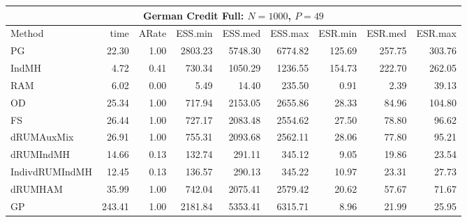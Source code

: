 \begin{table}
\begin{tabular}{l r r r r r r r r } 
\hline
\multicolumn{9}{c}{German Credit Full: $N = 1000$, $P=49$} \\
\hline
          Method  &     time &    ARate &  ESS.min &  ESS.med &  ESS.max &  ESR.min &  ESR.med &  ESR.max \\ 
              PG  &    22.30 &     1.00 &  2803.23 &  5748.30 &  6774.82 &   125.69 &   257.75 &   303.76 \\ 
           IndMH  &     4.72 &     0.41 &   730.34 &  1050.29 &  1236.55 &   154.73 &   222.70 &   262.05 \\ 
             RAM  &     6.02 &     0.00 &     5.49 &    14.40 &   235.50 &     0.91 &     2.39 &    39.13 \\ 
              OD  &    25.34 &     1.00 &   717.94 &  2153.05 &  2655.86 &    28.33 &    84.96 &   104.80 \\ 
              FS  &    26.44 &     1.00 &   727.17 &  2083.48 &  2554.62 &    27.50 &    78.80 &    96.62 \\ 
      dRUMAuxMix  &    26.91 &     1.00 &   755.31 &  2093.68 &  2562.11 &    28.06 &    77.80 &    95.21 \\ 
       dRUMIndMH  &    14.66 &     0.13 &   132.74 &   291.11 &   345.12 &     9.05 &    19.86 &    23.54 \\ 
  IndivdRUMIndMH  &    12.45 &     0.13 &   136.57 &   290.13 &   345.22 &    10.97 &    23.31 &    27.73 \\ 
         dRUMHAM  &    35.99 &     1.00 &   742.04 &  2075.41 &  2579.42 &    20.62 &    57.67 &    71.67 \\ 
              GP  &   243.41 &     1.00 &  2181.84 &  5353.41 &  6315.71 &     8.96 &    21.99 &    25.95
 \end{tabular}
\end{table}



